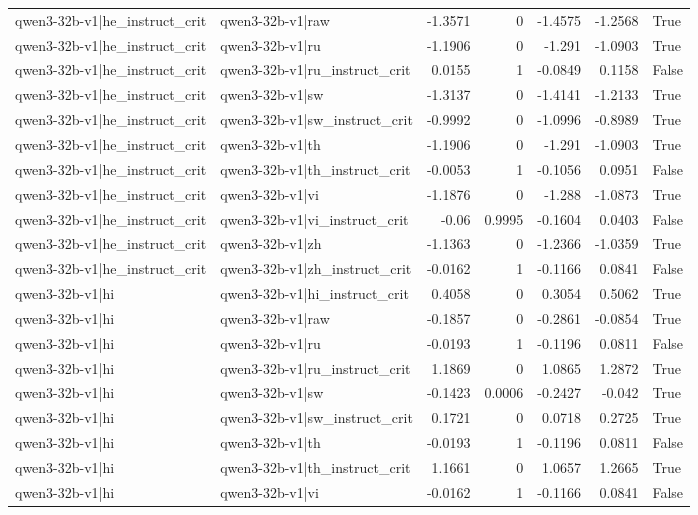 \begin{table}
\begin{tabular}{l l r r r r l}
qwen3-32b-v1|he_instruct_crit & qwen3-32b-v1|raw & -1.3571 & 0 & -1.4575 & -1.2568 & True \\
qwen3-32b-v1|he_instruct_crit & qwen3-32b-v1|ru & -1.1906 & 0 & -1.291 & -1.0903 & True \\
qwen3-32b-v1|he_instruct_crit & qwen3-32b-v1|ru_instruct_crit & 0.0155 & 1 & -0.0849 & 0.1158 & False \\
qwen3-32b-v1|he_instruct_crit & qwen3-32b-v1|sw & -1.3137 & 0 & -1.4141 & -1.2133 & True \\
qwen3-32b-v1|he_instruct_crit & qwen3-32b-v1|sw_instruct_crit & -0.9992 & 0 & -1.0996 & -0.8989 & True \\
qwen3-32b-v1|he_instruct_crit & qwen3-32b-v1|th & -1.1906 & 0 & -1.291 & -1.0903 & True \\
qwen3-32b-v1|he_instruct_crit & qwen3-32b-v1|th_instruct_crit & -0.0053 & 1 & -0.1056 & 0.0951 & False \\
qwen3-32b-v1|he_instruct_crit & qwen3-32b-v1|vi & -1.1876 & 0 & -1.288 & -1.0873 & True \\
qwen3-32b-v1|he_instruct_crit & qwen3-32b-v1|vi_instruct_crit & -0.06 & 0.9995 & -0.1604 & 0.0403 & False \\
qwen3-32b-v1|he_instruct_crit & qwen3-32b-v1|zh & -1.1363 & 0 & -1.2366 & -1.0359 & True \\
qwen3-32b-v1|he_instruct_crit & qwen3-32b-v1|zh_instruct_crit & -0.0162 & 1 & -0.1166 & 0.0841 & False \\
qwen3-32b-v1|hi & qwen3-32b-v1|hi_instruct_crit & 0.4058 & 0 & 0.3054 & 0.5062 & True \\
qwen3-32b-v1|hi & qwen3-32b-v1|raw & -0.1857 & 0 & -0.2861 & -0.0854 & True \\
qwen3-32b-v1|hi & qwen3-32b-v1|ru & -0.0193 & 1 & -0.1196 & 0.0811 & False \\
qwen3-32b-v1|hi & qwen3-32b-v1|ru_instruct_crit & 1.1869 & 0 & 1.0865 & 1.2872 & True \\
qwen3-32b-v1|hi & qwen3-32b-v1|sw & -0.1423 & 0.0006 & -0.2427 & -0.042 & True \\
qwen3-32b-v1|hi & qwen3-32b-v1|sw_instruct_crit & 0.1721 & 0 & 0.0718 & 0.2725 & True \\
qwen3-32b-v1|hi & qwen3-32b-v1|th & -0.0193 & 1 & -0.1196 & 0.0811 & False \\
qwen3-32b-v1|hi & qwen3-32b-v1|th_instruct_crit & 1.1661 & 0 & 1.0657 & 1.2665 & True \\
qwen3-32b-v1|hi & qwen3-32b-v1|vi & -0.0162 & 1 & -0.1166 & 0.0841 & False \\

\end{tabular}
\end{table}
